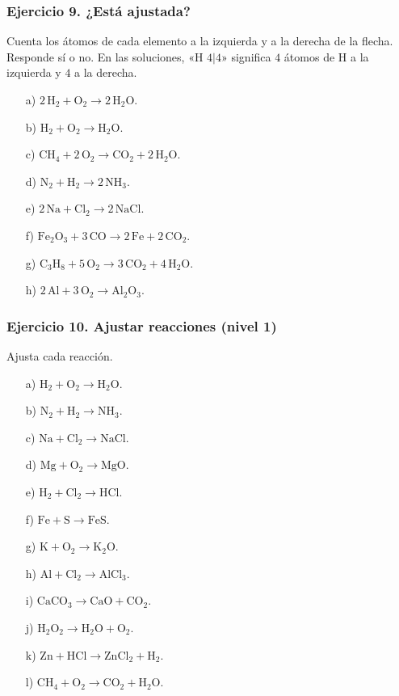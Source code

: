 \subsubsection*{Ejercicio 9. ¿Está ajustada?}

Cuenta los átomos de cada elemento a la izquierda y a la derecha de la flecha.
Responde sí o no. En las soluciones, «H $4|4$» significa
$4$ átomos de H a la izquierda y $4$ a la derecha.

\begin{enumerate}
    \item[a)] $2\,\mathrm{H_2}+\mathrm{O_2}\rightarrow2\,\mathrm{H_2O}$.
    \item[b)] $\mathrm{H_2}+\mathrm{O_2}\rightarrow\mathrm{H_2O}$.
    \item[c)] $\mathrm{CH_4}+2\,\mathrm{O_2}\rightarrow
    \mathrm{CO_2}+2\,\mathrm{H_2O}$.
    \item[d)] $\mathrm{N_2}+\mathrm{H_2}\rightarrow2\,\mathrm{NH_3}$.
    \item[e)] $2\,\mathrm{Na}+\mathrm{Cl_2}\rightarrow2\,\mathrm{NaCl}$.
    \item[f)] $\mathrm{Fe_2O_3}+3\,\mathrm{CO}\rightarrow
    2\,\mathrm{Fe}+2\,\mathrm{CO_2}$.
    \item[g)] $\mathrm{C_3H_8}+5\,\mathrm{O_2}\rightarrow
    3\,\mathrm{CO_2}+4\,\mathrm{H_2O}$.
    \item[h)] $2\,\mathrm{Al}+3\,\mathrm{O_2}\rightarrow\mathrm{Al_2O_3}$.
\end{enumerate}

\subsubsection*{Ejercicio 10. Ajustar reacciones (nivel 1)}

Ajusta cada reacción.

\begin{enumerate}
    \item[a)] $\mathrm{H_2}+\mathrm{O_2}\rightarrow\mathrm{H_2O}$.
    \item[b)] $\mathrm{N_2}+\mathrm{H_2}\rightarrow\mathrm{NH_3}$.
    \item[c)] $\mathrm{Na}+\mathrm{Cl_2}\rightarrow\mathrm{NaCl}$.
    \item[d)] $\mathrm{Mg}+\mathrm{O_2}\rightarrow\mathrm{MgO}$.
    \item[e)] $\mathrm{H_2}+\mathrm{Cl_2}\rightarrow\mathrm{HCl}$.
    \item[f)] $\mathrm{Fe}+\mathrm{S}\rightarrow\mathrm{FeS}$.
    \item[g)] $\mathrm{K}+\mathrm{O_2}\rightarrow\mathrm{K_2O}$.
    \item[h)] $\mathrm{Al}+\mathrm{Cl_2}\rightarrow\mathrm{AlCl_3}$.
    \item[i)] $\mathrm{CaCO_3}\rightarrow\mathrm{CaO}+\mathrm{CO_2}$.
    \item[j)] $\mathrm{H_2O_2}\rightarrow\mathrm{H_2O}+\mathrm{O_2}$.
    \item[k)] $\mathrm{Zn}+\mathrm{HCl}\rightarrow\mathrm{ZnCl_2}+\mathrm{H_2}$.
    \item[l)] $\mathrm{CH_4}+\mathrm{O_2}\rightarrow\mathrm{CO_2}+\mathrm{H_2O}$.
\end{enumerate}

